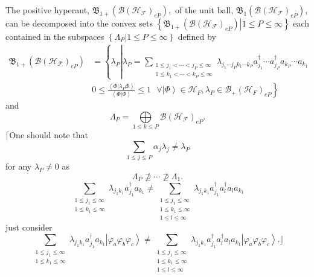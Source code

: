 \documentclass[aps,preprint]{revtex4}%
\begin{document}
The positive hyperant, $\mathfrak{B}_{1+}\left(  \mathcal{B}\left(
\mathcal{H}_{\mathcal{F}}\right)  _{eP}\right)  ,$ of the unit ball,
$\mathfrak{B}_{1}\left(  \mathcal{B}\left(  \mathcal{H}_{\mathcal{F}}\right)
_{eP}\right)  ,$ can be decomposed into the convex sets $\left\{  \left.
\mathfrak{B}_{1+}\left(  \mathcal{B}\left(  \mathcal{H}_{\mathcal{F}}\right)
_{eP}\right)  \right\vert 1\leq P\leq\infty\right\}  $ each contained in the
subspaces $\left\{  \left.  \Lambda_{P}\right\vert 1\leq P\leq\infty\right\}
$ defined by
\begin{align}
\mathfrak{B}_{1+}\left(  \mathcal{B}\left(  \mathcal{H}_{\mathcal{F}}\right)
_{eP}\right)   &  =\left\{  \lambda_{P}\left\vert \lambda_{P}=\sum
_{\substack{1\leq j_{1}<\cdots<j_{P}\leq\infty\\1\leq k_{1}<\cdots<k_{P}%
\leq\infty}}\lambda_{j_{1}\cdots j_{P}k_{1}\cdots k_{P}}a_{j_{1}}^{\dagger
}\cdots a_{j_{P}}^{\dagger}a_{k_{P}}\cdots a_{k_{1}}\right.  \right.
\nonumber\\
&  \left.  0\leq\frac{\left\langle \left.  \Phi\right\vert \lambda_{P}%
\Phi\right\rangle }{\left\langle \left.  \Phi\right\vert \Phi\right\rangle
}\leq1\text{ }\forall\left\vert \Phi\right\rangle \in\mathcal{H}_{F}%
,\lambda_{P}\in\mathcal{B}_{+}\left(  \mathcal{H}_{F}\right)  _{eP}\right\}
\end{align}
and
\begin{equation}
\Lambda_{P}=%
{\displaystyle\bigoplus\limits_{1\leq k\leq P}}
\mathcal{B}\left(  \mathcal{H}_{\mathcal{F}}\right)  _{eP}.
\end{equation}
$\lceil$One should note that
\begin{equation}
\sum_{1\leq j\leq P}\alpha_{j}\lambda_{j}\neq\lambda_{P}%
\end{equation}
for any $\lambda_{P}\neq0$ as
\begin{equation}
\Lambda_{P}\nsupseteq\cdots\nsupseteq\Lambda_{1}.
\end{equation}%
\begin{equation}
\sum_{\substack{1\leq j_{1}\leq\infty\\1\leq k_{1}\leq\infty}}\lambda
_{j_{1}k_{1}}a_{j_{1}}^{\dagger}a_{k_{1}}\neq\sum_{\substack{1\leq j_{1}%
\leq\infty\\1\leq k_{1}\leq\infty\\1\leq l\leq\infty}}\lambda_{j_{1}k_{1}%
}a_{j_{1}}^{\dagger}a_{l}^{\dagger}a_{l}a_{k_{1}}%
\end{equation}
just consider
\begin{equation}
\sum_{\substack{1\leq j_{1}\leq\infty\\1\leq k_{1}\leq\infty}}\lambda
_{j_{1}k_{1}}a_{j_{1}}^{\dagger}a_{k_{1}}\left\vert \varphi_{a}\varphi
_{b}\varphi_{c}\right\rangle \neq\sum_{\substack{1\leq j_{1}\leq\infty\\1\leq
k_{1}\leq\infty\\1\leq l\leq\infty}}\lambda_{j_{1}k_{1}}a_{j_{1}}^{\dagger
}a_{l}^{\dagger}a_{l}a_{k_{1}}\left\vert \varphi_{a}\varphi_{b}\varphi
_{c}\right\rangle .\rfloor
\end{equation}
\end{document}
